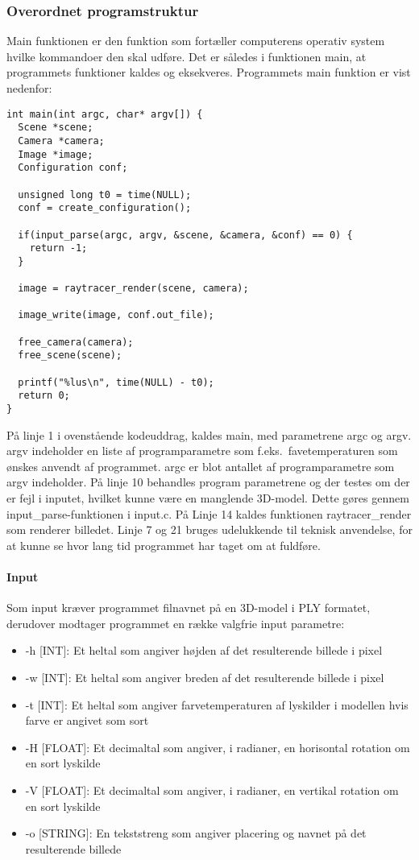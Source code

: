 \subsubsection{Overordnet programstruktur}
Main funktionen er den funktion som fortæller computerens operativ system hvilke kommandoer den skal udføre. Det er således i funktionen main, at programmets funktioner kaldes og eksekveres. Programmets main funktion er vist nedenfor:

\begin{lstlisting}[style=Cstyle, caption=Main]
int main(int argc, char* argv[]) {
  Scene *scene;
  Camera *camera;
  Image *image;
  Configuration conf;

  unsigned long t0 = time(NULL);
  conf = create_configuration();
  
  if(input_parse(argc, argv, &scene, &camera, &conf) == 0) {
    return -1;
  }
  
  image = raytracer_render(scene, camera);
  
  image_write(image, conf.out_file);

  free_camera(camera);
  free_scene(scene);
  
  printf("%lus\n", time(NULL) - t0);
  return 0;
}
\end{lstlisting}

På linje 1 i ovenstående kodeuddrag, kaldes main, med parametrene argc og argv. argv indeholder en liste af programparametre som f.eks.\ favetemperaturen som ønskes anvendt af programmet. argc er blot antallet af programparametre som argv indeholder. På linje 10 behandles program parametrene og der testes om der er fejl i inputet, hvilket kunne være en manglende 3D-model. Dette gøres gennem input\_parse-funktionen i input.c. På Linje 14 kaldes funktionen raytracer\_render som renderer billedet. Linje 7 og 21 bruges udelukkende til teknisk anvendelse, for at kunne se hvor lang tid programmet har taget om at fuldføre.

\paragraph{Input}
Som input kræver programmet filnavnet på en 3D-model i PLY formatet, derudover modtager programmet en række valgfrie input parametre:
\begin{itemize}
  \item -h [INT]: Et heltal som angiver højden af det resulterende billede i pixel
  \item -w [INT]: Et heltal som angiver breden af det resulterende billede i pixel
  \item -t [INT]: Et heltal som angiver farvetemperaturen af lyskilder i modellen hvis farve er angivet som sort
  \item -H [FLOAT]: Et decimaltal som angiver, i radianer, en horisontal rotation om en sort lyskilde
  \item -V [FLOAT]: Et decimaltal som angiver, i radianer, en vertikal rotation om en sort lyskilde
  \item -o [STRING]: En tekststreng som angiver placering og navnet på det resulterende billede
\end{itemize}

